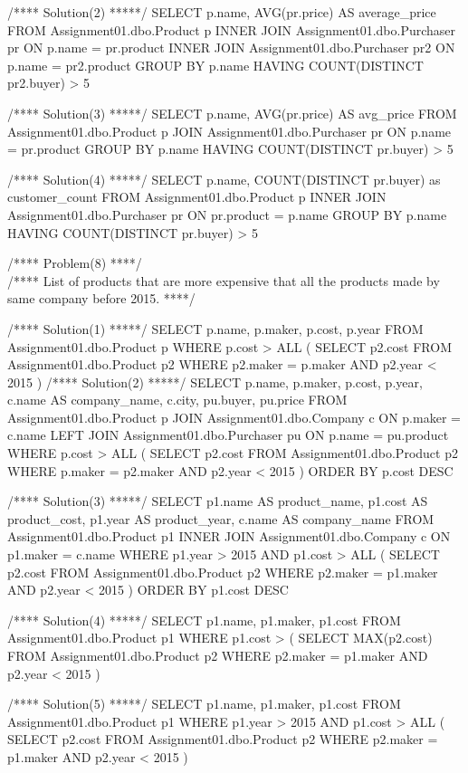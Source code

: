 /**** Solution(2) *****/ SELECT p.name, AVG(pr.price) AS average\_price
FROM Assignment01.dbo.Product p INNER JOIN Assignment01.dbo.Purchaser pr
ON p.name = pr.product INNER JOIN Assignment01.dbo.Purchaser pr2 ON
p.name = pr2.product GROUP BY p.name HAVING COUNT(DISTINCT pr2.buyer)
\textgreater{} 5

/**** Solution(3) *****/ SELECT p.name, AVG(pr.price) AS avg\_price FROM
Assignment01.dbo.Product p JOIN Assignment01.dbo.Purchaser pr ON p.name
= pr.product GROUP BY p.name HAVING COUNT(DISTINCT pr.buyer)
\textgreater{} 5

/**** Solution(4) *****/ SELECT p.name, COUNT(DISTINCT pr.buyer) as
customer\_count FROM Assignment01.dbo.Product p INNER JOIN
Assignment01.dbo.Purchaser pr ON pr.product = p.name GROUP BY p.name
HAVING COUNT(DISTINCT pr.buyer) \textgreater{} 5

/**** Problem(8) ****/\\
/**** List of products that are more expensive that all the products
made by same company before 2015. ****/

/**** Solution(1) *****/ SELECT p.name, p.maker, p.cost, p.year FROM
Assignment01.dbo.Product p WHERE p.cost \textgreater{} ALL ( SELECT
p2.cost FROM Assignment01.dbo.Product p2 WHERE p2.maker = p.maker AND
p2.year \textless{} 2015 ) /**** Solution(2) *****/ SELECT p.name,
p.maker, p.cost, p.year, c.name AS company\_name, c.city, pu.buyer,
pu.price FROM Assignment01.dbo.Product p JOIN Assignment01.dbo.Company c
ON p.maker = c.name LEFT JOIN Assignment01.dbo.Purchaser pu ON p.name =
pu.product WHERE p.cost \textgreater{} ALL ( SELECT p2.cost FROM
Assignment01.dbo.Product p2 WHERE p.maker = p2.maker AND p2.year
\textless{} 2015 ) ORDER BY p.cost DESC

/**** Solution(3) *****/ SELECT p1.name AS product\_name, p1.cost AS
product\_cost, p1.year AS product\_year, c.name AS company\_name FROM
Assignment01.dbo.Product p1 INNER JOIN Assignment01.dbo.Company c ON
p1.maker = c.name WHERE p1.year \textgreater{} 2015 AND p1.cost
\textgreater{} ALL ( SELECT p2.cost FROM Assignment01.dbo.Product p2
WHERE p2.maker = p1.maker AND p2.year \textless{} 2015 ) ORDER BY
p1.cost DESC

/**** Solution(4) *****/ SELECT p1.name, p1.maker, p1.cost FROM
Assignment01.dbo.Product p1 WHERE p1.cost \textgreater{} ( SELECT
MAX(p2.cost) FROM Assignment01.dbo.Product p2 WHERE p2.maker = p1.maker
AND p2.year \textless{} 2015 )

/**** Solution(5) *****/ SELECT p1.name, p1.maker, p1.cost FROM
Assignment01.dbo.Product p1 WHERE p1.year \textgreater{} 2015 AND
p1.cost \textgreater{} ALL ( SELECT p2.cost FROM
Assignment01.dbo.Product p2 WHERE p2.maker = p1.maker AND p2.year
\textless{} 2015 )

